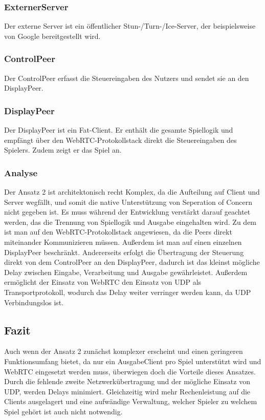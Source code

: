 \subsubsection{ExternerServer}
Der externe Server ist ein öffentlicher Stun-/Turn-/Ice-Server, der beispielsweise von Google bereitgestellt wird.
\subsubsection{ControlPeer}
Der ControlPeer erfasst die Steuereingaben des Nutzers und sendet sie an den DisplayPeer.
\subsubsection{DisplayPeer}
Der DisplayPeer ist ein Fat-Client. Er enthält die gesamte Spiellogik und empfängt über den WebRTC-Protokollstack direkt die Steuereingaben des Spielers. Zudem zeigt er das Spiel an.
\subsubsection{Analyse}
Der Ansatz 2 ist architektonisch recht Komplex, da die Aufteilung auf Client und Server wegfällt, und somit die native Unterstützung von Seperation of Concern nicht gegeben ist. Es muss während der Entwicklung verstärkt darauf geachtet werden, das die Trennung von Spiellogik und Ausgabe eingehalten wird. Zu dem ist man auf den WebRTC-Protokollstack angewiesen, da die Peers direkt miteinander Kommunizieren müssen. Außerdem ist man auf einen einzelnen DisplayPeer beschränkt. Andererseits erfolgt die Übertragung der Steuerung direkt von dem ControlPeer an den DisplayPeer, dadurch ist das kleinst mögliche Delay zwischen Eingabe, Verarbeitung und Ausgabe gewährleistet. Außerdem ermöglicht der Einsatz von WebRTC den Einsatz von UDP als Transportprotokoll, wodurch das Delay weiter verringer werden kann, da UDP Verbindungslos ist.
\subsection{Fazit}
Auch wenn der Ansatz 2 zunächst komplexer erscheint und einen geringeren Funktionsumfang bietet, da nur ein AusgabeClient pro Spiel unterstützt wird und WebRTC eingesetzt werden muss, überwiegen doch die Vorteile dieses Ansatzes. Durch die fehlende zweite Netzwerkübertragung und der mögliche Einsatz von UDP, werden Delays minimiert. Gleichzeitig wird mehr Rechenleistung auf die Clients ausgelagert und eine aufwändige Verwaltung, welcher Spieler zu welchem Spiel gehört ist auch nicht notwendig.


